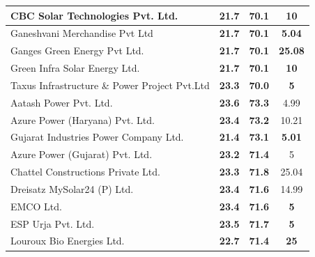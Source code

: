 \begin{table}[H]
\begin{tabular}{|l|c|c|c|}
    \hline
    CBC Solar Technologies Pvt. Ltd.  & \textbf{21.7} & \textbf{70.1} & 10 \bigstrut\\
    \hline
    Ganeshvani Merchandise Pvt Ltd & \textbf{21.7} & \textbf{70.1} & \textbf{5.04} \bigstrut\\
    \hline
    Ganges Green Energy Pvt Ltd. & \textbf{21.7} & \textbf{70.1} & \textbf{25.08} \bigstrut\\
    \hline
    Green Infra Solar Energy Ltd. & \textbf{21.7} & \textbf{70.1} & \textbf{10} \bigstrut\\
    \hline
    Taxus Infrastructure \& Power Project Pvt.Ltd & \textbf{23.3} & \textbf{70.0} & \textbf{5} \bigstrut\\
    \hline
    Aatash Power Pvt. Ltd. & \textbf{23.6} & \textbf{73.3} & 4.99 \bigstrut\\
    \hline
    Azure Power (Haryana) Pvt. Ltd. & \textbf{23.4} & \textbf{73.2} & 10.21 \bigstrut\\
    \hline
    Gujarat Industries Power Company Ltd. & \textbf{21.4} & \textbf{73.1} & \textbf{5.01} \bigstrut\\
    \hline
    Azure Power (Gujarat) Pvt. Ltd. & \textbf{23.2} & \textbf{71.4} & 5 \bigstrut\\
    \hline
    Chattel Constructions Private Ltd. & \textbf{23.3} & \textbf{71.8} & 25.04 \bigstrut\\
    \hline
    Dreisatz MySolar24 (P) Ltd. & \textbf{23.4} & \textbf{71.6} & 14.99 \bigstrut\\
    \hline
    EMCO Ltd. & \textbf{23.4} & \textbf{71.6} & \textbf{5} \bigstrut\\
    \hline
    ESP Urja Pvt. Ltd. & \textbf{23.5} & \textbf{71.7} & \textbf{5} \bigstrut\\
    \hline
    Louroux Bio Energies Ltd.  & \textbf{22.7} & \textbf{71.4} & \textbf{25} \bigstrut\\
    \hline
    \end{tabular}%


\end{table}


